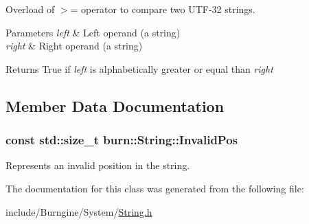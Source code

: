 Overload of $>$= operator to compare two U\-T\-F-\/32 strings. 


\begin{DoxyParams}{Parameters}
{\em left} & Left operand (a string) \\
\hline
{\em right} & Right operand (a string)\\
\hline
\end{DoxyParams}
\begin{DoxyReturn}{Returns}
True if {\itshape left} is alphabetically greater or equal than {\itshape right} 
\end{DoxyReturn}


\subsection{Member Data Documentation}
\hypertarget{classburn_1_1_string_adcc78caaf445a41121006dfbd91f1cdc}{
\subsubsection[{Invalid\-Pos}]{\setlength{\rightskip}{0pt plus 5cm}const std\-::size\-\_\-t burn\-::\-String\-::\-Invalid\-Pos\hspace{0.3cm}{\ttfamily [static]}}}\label{classburn_1_1_string_adcc78caaf445a41121006dfbd91f1cdc}


Represents an invalid position in the string. 



The documentation for this class was generated from the following file\-:\begin{DoxyCompactItemize}
\item 
include/\-Burngine/\-System/\hyperlink{_string_8h}{String.\-h}\end{DoxyCompactItemize}

